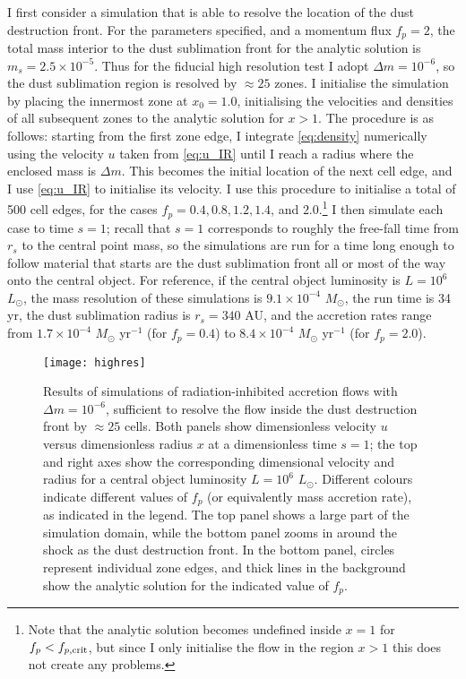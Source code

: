 \documentclass[useAMS,usenatbib]{mn2e}
\begin{document}
I first consider a simulation that is able to resolve the location of the dust destruction front. For the parameters specified, and a momentum flux $f_p = 2$, the total mass interior to the dust sublimation front for the analytic solution is $m_s = 2.5\times 10^{-5}$. Thus for the fiducial high resolution test I adopt $\Delta m = 10^{-6}$, so the dust sublimation region is resolved by $\approx 25$ zones. I initialise the simulation by placing the innermost zone at $x_0 = 1.0$, initialising the velocities and densities of all subsequent zones to the analytic solution for $x>1$. The procedure is as follows: starting from the first zone edge, I integrate \autoref{eq:density} numerically using the velocity $u$ taken from \autoref{eq:u_IR} until I reach a radius where the enclosed mass is $\Delta m$. This becomes the initial location of the next cell edge, and I use \autoref{eq:u_IR} to initialise its velocity. I use this procedure to initialise a total of 500 cell edges, for the cases $f_p = 0.4, 0.8, 1.2, 1.4$, and $2.0$.\footnote{Note that the analytic solution becomes undefined inside $x = 1$ for $f_p < f_{p,\rm crit}$, but since I only initialise the flow in the region $x>1$ this does not create any problems.} I then simulate each case to time $s=1$; recall that $s=1$ corresponds to roughly the free-fall time from $r_s$ to the central point mass, so the simulations are run for a time long enough to follow material that starts are the dust sublimation front all or most of the way onto the central object. For reference, if the central object luminosity is $L = 10^6$ $L_\odot$, the mass resolution of these simulations is $9.1\times 10^{-4}$ $M_\odot$, the run time is 34 yr, the dust sublimation radius is $r_s = 340$ AU, and the accretion rates range from $1.7\times 10^{-4}$ $M_\odot$ yr$^{-1}$ (for $f_p = 0.4$) to $8.4\times 10^{-4}$ $M_\odot$ yr$^{-1}$ (for $f_p = 2.0$).

\begin{figure}
\texttt{[image: highres]}
\caption{
\label{fig:highres}
Results of simulations of radiation-inhibited accretion flows with $\Delta m = 10^{-6}$, sufficient to resolve the flow inside the dust destruction front by $\approx 25$ cells. Both panels show dimensionless velocity $u$ versus dimensionless radius $x$ at a dimensionless time $s=1$; the top and right axes show the corresponding dimensional velocity and radius for a central object luminosity $L = 10^6$ $L_\odot$. Different colours indicate different values of $f_p$ (or equivalently mass accretion rate), as indicated in the legend. The top panel shows a large part of the simulation domain, while the bottom panel zooms in around the shock as the dust destruction front. In the bottom panel, circles represent individual zone edges, and thick lines in the background show the analytic solution for the indicated value of $f_p$. 
}
\end{figure}
\end{document}
